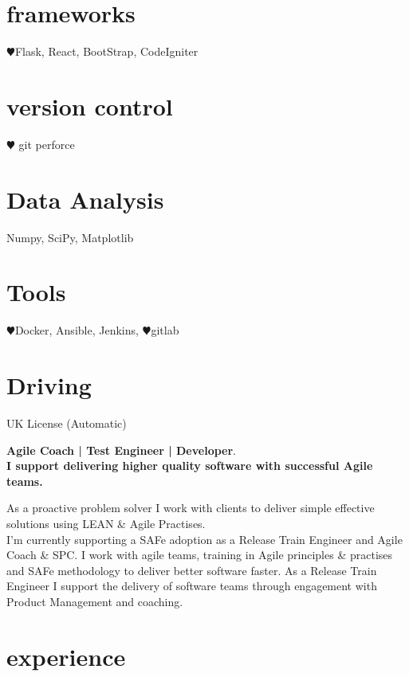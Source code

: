 \documentclass[]{cv-style}          %
\begin{document}
\begin{aside}
\section{frameworks}
{\color{red} $\varheartsuit$}Flask, React, BootStrap, CodeIgniter
\section{version control}
{\color{red} $\varheartsuit$} git perforce
\section{Data Analysis}
Numpy, SciPy, Matplotlib
\section{Tools}
{\color{red} $\varheartsuit$}Docker, Ansible, Jenkins, {\color{red} $\varheartsuit$}gitlab
\section{Driving}UK License (Automatic)
\end{aside}

\textbf{Agile Coach | Test Engineer | Developer}.\\\textbf{I support delivering higher quality software with successful Agile teams.}\par
As a proactive problem solver I work with clients to deliver simple effective solutions using LEAN \& Agile Practises.\\
I'm currently supporting a SAFe adoption as a Release Train Engineer and Agile Coach \& SPC.
I work with agile teams, training in Agile principles \& practises and SAFe methodology to deliver better software faster. As a Release Train Engineer I support the delivery of software teams through engagement with Product Management and coaching.



\section{experience}
\end{document}
